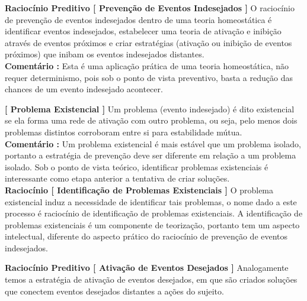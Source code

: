 \documentclass[10pt,a4paper]{report}
\begin{document}
\textbf{Raciocínio Preditivo [ Prevenção de Eventos Indesejados ]} O raciocínio de prevenção de eventos indesejados dentro de uma teoria homeostática é identificar eventos indesejados, estabelecer uma teoria de ativação e inibição através de eventos próximos e criar estratégias (ativação ou inibição de eventos próximos) que inibam os eventos indesejados distantes.\\

\textbf{Comentário :} Esta é uma aplicação prática de uma teoria homeostática, não requer determinismo, pois sob o ponto de vista preventivo, basta a redução das chances de um evento indesejado acontecer.

\hspace{\baselineskip}

\textbf{[ Problema Existencial ]} Um problema (evento indesejado) é dito existencial se ela forma uma rede de ativação com outro problema, ou seja, pelo menos dois problemas distintos corroboram entre si para estabilidade mútua.\\

\textbf{Comentário :} Um problema existencial é mais estável que um problema isolado, portanto a estratégia de prevenção deve ser diferente em relação a um problema isolado. Sob o ponto de vista teórico, identificar problemas existenciais é interessante como etapa anterior a tentativa de criar soluções.\\

\textbf{Raciocínio [ Identificação de Problemas Existenciais ]} O problema existencial induz a necessidade de identificar tais problemas, o nome dado a este processo é raciocínio de identificação de problemas existenciais. A identificação de problemas existenciais é um componente de teorização, portanto tem um aspecto intelectual, diferente do aspecto prático do raciocínio de prevenção de eventos indesejados.

\hspace{\baselineskip}

\textbf{Raciocínio Preditivo [ Ativação de Eventos Desejados ]} Analogamente temos a estratégia de ativação de eventos desejados, em que são criados soluções que conectem eventos desejados distantes a ações do sujeito.
\end{document}
